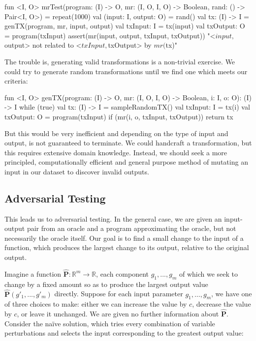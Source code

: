 \begin{kotlinlisting}
fun <I, O> mrTest(program: (I) -> O, mr: (I, O, I, O) -> Boolean, rand: () -> Pair<I, O>) =
    repeat(1000) {
        val (input: I, output: O) = rand()
        val tx: (I) -> I = genTX(program, mr, input, output)
        val txInput: I = tx(input)
        val txOutput: O = program(txInput)
        assert(mr(input, output, txInput, txOutput)) {
            "<$input, $output> not related to <$txInput, $txOutput> by $mr ($tx)"
        }
    }
\end{kotlinlisting}
%
The trouble is, generating valid transformations is a non-trivial exercise. We could try to generate random transformations until we find one which meets our criteria:
%
\begin{kotlinlisting}
fun <I, O> genTX(program: (I) -> O, mr: (I, O, I, O) -> Boolean, i: I, o: O): (I) -> I {
    while (true) {
        val tx: (I) -> I = sampleRandomTX()
        val txInput: I = tx(i)
        val txOutput: O = program(txInput)
        if (mr(i, o, txInput, txOutput)) return tx
    }
}
\end{kotlinlisting}

But this would be very inefficient and depending on the type of input and output, is not guaranteed to terminate. We could handcraft a transformation, but this requires extensive domain knowledge. Instead, we should seek a more principled, computationally efficient and general purpose method of mutating an input in our dataset to discover invalid outputs.

\subsection{Adversarial Testing}

This leads us to adversarial testing. In the general case, we are given an input-output pair from an oracle and a program approximating the oracle, but not necessarily the oracle itself. Our goal is to find a small change to the input of a function, which produces the largest change to its output, relative to the original output.

Imagine a function $\mathbf{\hat P}: \mathbb R^m \rightarrow \mathbb R$, each component $g_1, ..., g_{m}$ of which we seek to change by a fixed amount so as to produce the largest output value $\mathbf{\hat P}(g'_1, ..., g'_{m})$ directly. Suppose for each input parameter $g_1, \ldots, g_{m}$, we have one of three choices to make: either we can increase the value by $c$, decrease the value by $c$, or leave it unchanged. We are given no further information about $\mathbf{\hat P}$. Consider the na\"ive solution, which tries every combination of variable perturbations and selects the input corresponding to the greatest output value:

